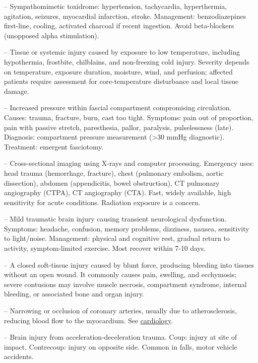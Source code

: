-- Sympathomimetic toxidrome: hypertension, tachycardia, hyperthermia, agitation, seizures, myocardial infarction, stroke. Management: benzodiazepines first-line, cooling, activated charcoal if recent ingestion. Avoid beta-blockers (unopposed alpha stimulation).

-- Tissue or systemic injury caused by exposure to low temperature, including hypothermia, frostbite, chilblains, and non-freezing cold injury. Severity depends on temperature, exposure duration, moisture, wind, and perfusion; affected patients require assessment for core-temperature disturbance and local tissue damage.

-- Increased pressure within fascial compartment compromising circulation. Causes: trauma, fracture, burn, cast too tight. Symptoms: pain out of proportion, pain with passive stretch, paresthesia, pallor, paralysis, pulselessness (late). Diagnosis: compartment pressure measurement (>30 mmHg diagnostic). Treatment: emergent fasciotomy.

-- Cross-sectional imaging using X-rays and computer processing. Emergency uses: head trauma (hemorrhage, fracture), chest (pulmonary embolism, aortic dissection), abdomen (appendicitis, bowel obstruction), CT pulmonary angiography (CTPA), CT angiography (CTA). Fast, widely available, high sensitivity for acute conditions. Radiation exposure is a concern.

-- Mild traumatic brain injury causing transient neurological dysfunction. Symptoms: headache, confusion, memory problems, dizziness, nausea, sensitivity to light/noise. Management: physical and cognitive rest, gradual return to activity, symptom-limited exercise. Most recover within 7-10 days.

-- A closed soft-tissue injury caused by blunt force, producing bleeding into tissues without an open wound. It commonly causes pain, swelling, and ecchymosis; severe contusions may involve muscle necrosis, compartment syndrome, internal bleeding, or associated bone and organ injury.

-- Narrowing or occlusion of coronary arteries, usually due to atherosclerosis, reducing blood flow to the myocardium. See \hyperlink{Cardiology}{cardiology}.

-- Brain injury from acceleration-deceleration trauma. Coup: injury at site of impact. Contrecoup: injury on opposite side. Common in falls, motor vehicle accidents.

